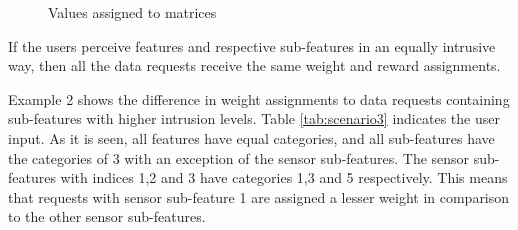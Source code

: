 \begin{figure}[htp]
  \hspace{1em}
  \caption{Values assigned to matrices}
  \label{fig:scenatio11}
\end{figure}

%

If the users perceive features and respective sub-features in an equally intrusive way, then all the
data requests receive the same weight and reward assignments.

Example 2 shows the difference in weight assignments to data requests containing sub-features with higher intrusion levels.
Table \ref{tab:scenario3} indicates the user input. As it is seen, all features have equal categories, and
all sub-features have the categories of 3 with an exception of the sensor sub-features. The sensor sub-features with indices 1,2 and 3 have  categories 1,3 and 5 respectively. This means that requests with sensor sub-feature 1 are assigned a lesser weight in comparison to the other sensor sub-features. 


